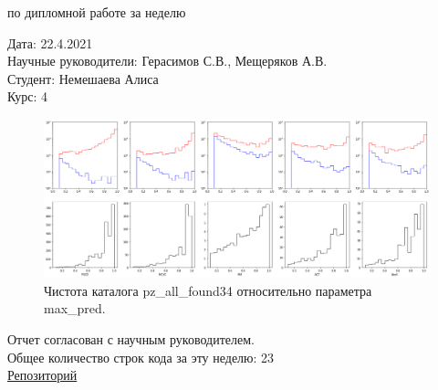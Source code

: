\documentclass{article}
\begin{document}
\begin{center}{ по дипломной работе за неделю\\}\end{center}
Дата: 22.4.2021\\
Научные руководители: Герасимов С.В., Мещеряков А.В.\\
Студент: Немешаева Алиса\\
Курс: 4\\

\renewcommand{\labelitemi}{$\blacksquare$}
\renewcommand\labelitemii{$\square$}


\begin{figure}[h]
    \includegraphics[width=\linewidth]{div}
\caption{Чистота каталога pz\_all\_found34 относительно параметра max\_pred.}
\label{Fig:div}
\end{figure}

Отчет согласован с научным руководителем.\\
Общее количество строк кода за эту неделю: 23\\
\href{https://github.com/rt2122/data-segmentation-2}{Репозиторий}\\ 
\end{document}
